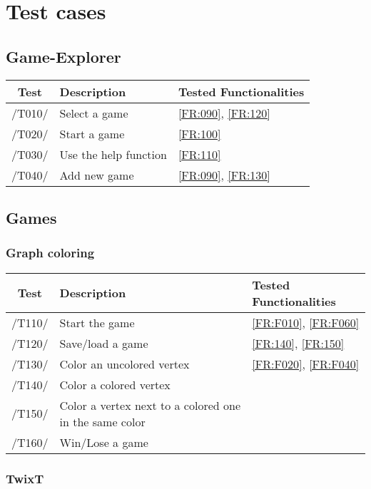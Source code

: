\section{Test cases}

\subsection{Game-Explorer}

\begin{tabular}{cll}

\hline
\textbf{Test} & \textbf{Description} & \textbf{Tested Functionalities} \\
\hline
/T010/ & Select a game & \ref{FR:090}, \ref{FR:120} \\
/T020/ & Start a game & \ref{FR:100} \\
/T030/ & Use the help function & \ref{FR:110} \\
/T040/ & Add new game & \ref{FR:090}, \ref{FR:130} \\
\hline

\end{tabular}

\subsection{Games}

\subsubsection{Graph coloring}

\begin{tabular}{cll}

\hline
\textbf{Test} & \textbf{Description} & \textbf{Tested Functionalities} \\
\hline
/T110/ & Start the game & \ref{FR:F010}, \ref{FR:F060} \\
/T120/ & Save/load a game & \ref{FR:140}, \ref{FR:150}\\
/T130/ & Color an uncolored vertex & \ref{FR:F020}, \ref{FR:F040}\\
/T140/ & Color a colored vertex & \\
/T150/ & Color a vertex next to a colored one in the same color & \\
/T160/ & Win/Lose a game & \\
\hline

\end{tabular}

\subsubsection{TwixT}

